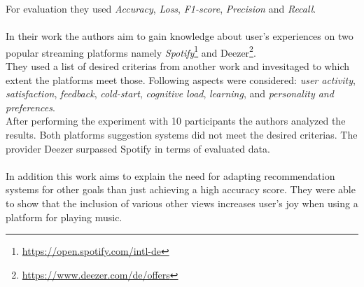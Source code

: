 \documentclass[runningheads,a4paper]{llncs}
\begin{document}
For evaluation they used \textit{Accuracy}, \textit{Loss}, \textit{F1-score}, \textit{Precision} and \textit{Recall}.\cite{priyanka2023novel}\\
\\
In their work \cite{de2022evaluating} the authors aim to gain knowledge about user's experiences on two popular streaming platforms namely 
\textit{Spotify}\footnote{\url{https://open.spotify.com/intl-de}} and Deezer\footnote{\url{https://www.deezer.com/de/offers}}. \\
They used a list of desired criterias from another work and invesitaged to which extent the platforms meet those.
Following aspects were considered:
\textit{user activity},
\textit{satisfaction},
\textit{feedback},
\textit{cold-start},
\textit{cognitive load},
\textit{learning},
and \textit{personality and preferences}.\\
After performing the experiment with 10 participants the authors analyzed the results.
Both platforms suggestion systems did not meet the desired criterias. 
The provider Deezer surpassed Spotify in terms of evaluated data. \\
\\
In addition this work aims to explain the need for adapting recommendation systems for other goals than just achieving a high accuracy score.
They were able to show that the inclusion of various other views increases user's joy when using a platform for playing music.
\end{document}
